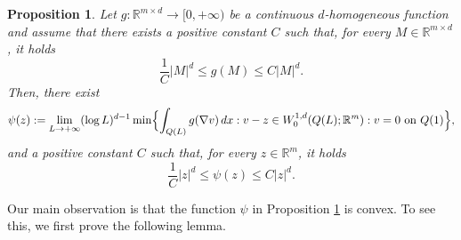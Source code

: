 \documentclass{article}
\theoremstyle{plain}
\newtheorem{proposition}[theorem]{Proposition}
\theoremstyle{definition}
\def\rr{{\mathbb R}}
\numberwithin{equation}{section}
\begin{document}
\begin{proposition}\label{prop: limite log} Let $g: \rr^{m\times d}\to [0,+\infty)$ be a continuous $d$-homogeneous function and assume that there exists a positive constant $C$ such that,  for every $M\in\rr^{m\times d}$, it holds
\begin{equation*}
    \frac{1}{C}|M|^d\leq g(M)\leq C|M|^d.
\end{equation*}
Then, there exist
\begin{equation*}
    \psi(z):=\lim_{L\to+\infty}(\log L)^{d-1}\min\Bigl\{\int_{Q(L)}g(\nabla v)\, dx : v-z\in W^{1,d}_0(Q(L); \rr^m): v= 0 \text{ on } Q(1)\Bigr\},
\end{equation*}
and a positive constant $C$ such that,  for every $z\in\rr^{m}$, it holds
\begin{equation*}
    \frac{1}{C}|z|^d\leq \psi(z)\leq C|z|^d.
\end{equation*}
\end{proposition}

Our main observation is that the function $\psi$ in Proposition \ref{prop: limite log} is convex. To see this, we first prove the following lemma.
\end{document}
